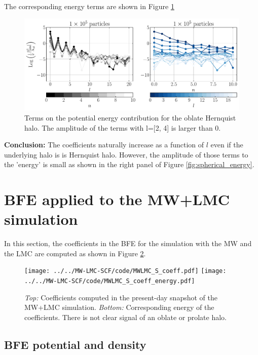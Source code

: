 \documentclass[14pt]{article}
\begin{document}
The corresponding energy terms are shown in Figure \ref{fig:energy_oblate}

\begin{figure}[H]
  \centering
  \includegraphics[scale=0.5]{../code/energy_terms_oblate_hern_a_40_1E5.pdf}
  \caption{Terms on the potential energy contribution for the oblate Hernquist halo.
The amplitude of the terms with l=[2, 4] is larger than 0.} \label{fig:energy_oblate}
\end{figure}




\textbf{Conclusion:} The coefficients naturally increase as a function of $l$
even if the underlying halo is is Hernquist halo. However, the amplitude of those terms
to the 'energy' is small as shown in the right panel of Figure \ref{fig:spherical_energy}.\\

\section{BFE applied to the MW+LMC simulation}

In this section, the coefficients in the BFE for the simulation with the MW and
the LMC are computed as shown in Figure \ref{fig:MW_LMC_coeff}.

\begin{figure}[H]
  \centering
  \texttt{[image: ../../MW-LMC-SCF/code/MWLMC\_S\_coeff.pdf]}
  \texttt{[image: ../../MW-LMC-SCF/code/MWLMC\_S\_coeff\_energy.pdf]}
  \caption{\textit{Top:} Coefficients computed in the present-day snapshot of the MW+LMC
  simulation. \textit{Bottom:} Corresponding energy of the coefficients. There
  is not clear signal of an oblate or prolate halo.}\label{fig:MW_LMC_coeff}
\end{figure}


\subsection{BFE potential and density}
\end{document}
